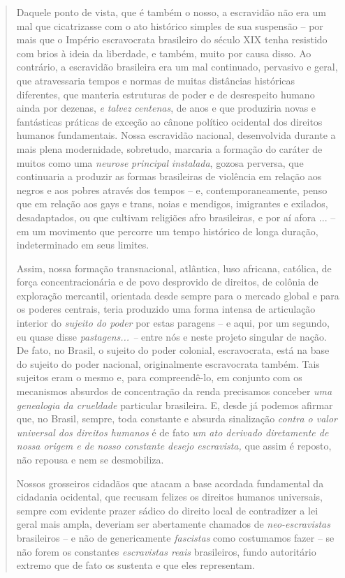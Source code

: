 \begin{quote}
Daquele ponto de vista, que é também o nosso, a escravidão não era um
mal que cicatrizasse com o ato histórico simples de sua suspensão -- por
mais que o Império escravocrata brasileiro do século XIX tenha resistido
com brios à ideia da liberdade, e também, muito por causa disso. Ao
contrário, a escravidão brasileira era um mal continuado, pervasivo e
geral, que atravessaria tempos e normas de muitas distâncias históricas
diferentes, que manteria estruturas de poder e de desrespeito humano
ainda por dezenas, \emph{e} \emph{talvez} \emph{centenas}, de anos e que
produziria novas e fantásticas práticas de exceção ao cânone político
ocidental dos direitos humanos fundamentais. Nossa escravidão nacional,
desenvolvida durante a mais plena modernidade, sobretudo, marcaria a
formação do caráter de muitos como uma \emph{neurose} \emph{principal}
\emph{instalada}, gozosa perversa, que continuaria a produzir as formas
brasileiras de violência em relação aos negros e aos pobres através dos
tempos -- e, contemporaneamente, penso que em relação aos gays e trans,
noias e mendigos, imigrantes e exilados, desadaptados, ou que cultivam
religiões afro brasileiras, e por aí afora ... -- em um movimento que
percorre um tempo histórico de longa duração, indeterminado em seus
limites.

Assim, nossa formação transnacional, atlântica, luso africana, católica,
de força concentracionária e de povo desprovido de direitos, de colônia
de exploração mercantil, orientada desde sempre para o mercado global e
para os poderes centrais, teria produzido uma forma intensa de
articulação interior do \emph{sujeito do poder} por estas paragens -- e
aqui, por um segundo, eu quase disse \emph{pastagens... --} entre nós e
neste projeto singular de nação. De fato, no Brasil, o sujeito do poder
colonial, escravocrata, está na base do sujeito do poder nacional,
originalmente escravocrata também. Tais sujeitos eram o mesmo e, para
compreendê-lo, em conjunto com os mecanismos absurdos de concentração da
renda precisamos conceber \emph{uma genealogia da crueldade} particular
brasileira. E, desde já podemos afirmar que, no Brasil, sempre, toda
constante e absurda sinalização \emph{contra o valor universal dos
direitos humanos} é de fato \emph{um ato derivado diretamente de nossa
origem e de nosso constante desejo escravista,} que assim é reposto, não
repousa e nem se desmobiliza.

Nossos grosseiros cidadãos que atacam a base acordada fundamental da
cidadania ocidental, que recusam felizes os direitos humanos universais,
sempre com evidente prazer sádico do direito local de contradizer a lei
geral mais ampla, deveriam ser abertamente chamados de
\emph{neo-escravistas} brasileiros -- e não de genericamente
\emph{fascistas} como costumamos fazer -- se não forem os constantes
\emph{escravistas reais} brasileiros, fundo autoritário extremo que de
fato os sustenta e que eles representam.


\end{quote}
